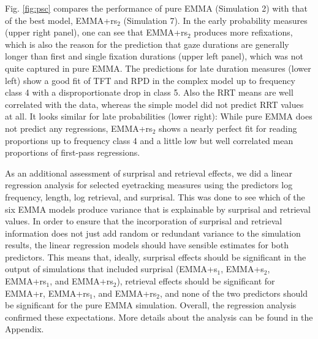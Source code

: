 \documentclass{cambridge7A}\usepackage[]{graphicx}\usepackage[]{color}
\begin{document}
Fig. \ref{fig:psc} compares the performance of pure EMMA (Simulation 2) with that of the best model, EMMA+rs$_2$ (Simulation 7).  In the early probability measures (upper right panel), one can see that EMMA+rs$_2$ produces more refixations, which is also the reason for the prediction that gaze durations are generally longer than first and single fixation durations (upper left panel), which was not quite captured in pure EMMA.  The predictions for late duration measures (lower left) show a good fit of TFT and RPD in the complex model up to frequency class 4 with a disproportionate drop in class 5.  Also the RRT means are well correlated with the data, whereas the simple model did not predict RRT values at all.  It looks similar for late probabilities (lower right): While pure EMMA does not predict any regressions, EMMA+rs$_2$ shows a nearly perfect fit for reading proportions up to frequency class 4 and a little low but well correlated mean proportions of first-pass regressions.

As an additional assessment of surprisal and retrieval effects, we did a linear regression analysis for selected eyetracking measures using the predictors log frequency, length, log retrieval, and surprisal.  This was done to see which of the six EMMA models produce variance that is explainable by surprisal and retrieval values.  In order to ensure that the incorporation of surprisal and retrieval information does not just add random or redundant variance to the simulation results, the linear regression models should have sensible estimates for both predictors.  This means that, ideally, surprisal effects should be significant in the output of simulations that included surprisal (EMMA+s$_1$, EMMA+s$_2$, EMMA+rs$_1$, and EMMA+rs$_2$), retrieval effects should be significant for EMMA+r, EMMA+rs$_1$, and EMMA+rs$_2$, and none of the two predictors should be significant for the pure EMMA simulation.  
Overall, the regression analysis confirmed these expectations.  More details about the analysis can be found in the Appendix. 
\end{document}
